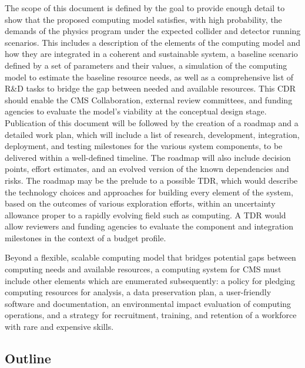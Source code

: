 The scope of this document is defined by the goal to provide enough detail to show that the proposed computing model satisfies, with high probability, the demands of the physics program under the expected collider and detector running scenarios. This includes a description of the elements of the computing model and how they are integrated in a coherent and sustainable system, a baseline scenario defined by a set of parameters and their values, a simulation of the computing model to estimate the baseline resource needs, as well as a comprehensive list of R\&D tasks to bridge the gap between needed and available resources. This \gls{CDR} should enable the CMS Collaboration, external review committees, and funding agencies to evaluate the model’s viability at the conceptual design stage. Publication of this document will be followed by the creation of a roadmap and a detailed work plan, which will include a list of research, development, integration, deployment, and testing milestones for the various system components, to be delivered within a well-defined timeline. The roadmap will also include decision points, effort estimates, and an evolved version of the known dependencies and risks. The roadmap may be the prelude to a possible \gls{TDR}, which would describe the technology choices and approaches for building every element of the system, based on the outcomes of various exploration efforts, within an uncertainty allowance proper to a rapidly evolving field such as computing. A \gls{TDR} would allow reviewers and funding agencies to evaluate the component and integration milestones in the context of a budget profile. 

Beyond a flexible, scalable computing model that bridges potential gaps between computing needs and available resources, a computing system for CMS must include other elements which are enumerated subsequently: a policy for pledging computing resources for analysis, a data preservation plan, a user-friendly software and documentation, an environmental impact evaluation of computing operations, and a strategy for recruitment, training, and retention of a workforce with rare and expensive skills.

\subsection{Outline}

